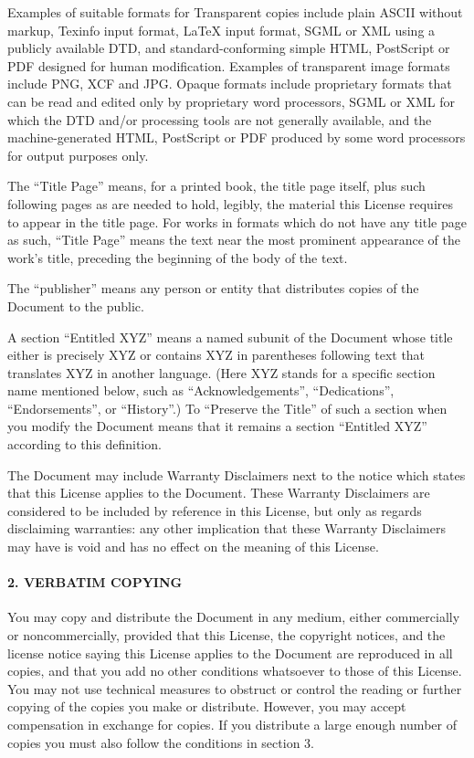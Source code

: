Examples of suitable formats for Transparent copies include plain ASCII
without markup, Texinfo input format, LaTeX input format, SGML or XML
using a publicly available DTD, and standard-conforming simple HTML,
PostScript or PDF designed for human modification. Examples of
transparent image formats include PNG, XCF and JPG. Opaque formats
include proprietary formats that can be read and edited only by
proprietary word processors, SGML or XML for which the DTD and/or
processing tools are not generally available, and the machine-generated
HTML, PostScript or PDF produced by some word processors for output
purposes only.

The ``Title Page'' means, for a printed book, the title page itself,
plus such following pages as are needed to hold, legibly, the material
this License requires to appear in the title page. For works in formats
which do not have any title page as such, ``Title Page'' means the text
near the most prominent appearance of the work's title, preceding the
beginning of the body of the text.

The ``publisher'' means any person or entity that distributes copies of
the Document to the public.

A section ``Entitled XYZ'' means a named subunit of the Document whose
title either is precisely XYZ or contains XYZ in parentheses following
text that translates XYZ in another language. (Here XYZ stands for a
specific section name mentioned below, such as ``Acknowledgements'',
``Dedications'', ``Endorsements'', or ``History''.) To ``Preserve the
Title'' of such a section when you modify the Document means that it
remains a section ``Entitled XYZ'' according to this definition.

The Document may include Warranty Disclaimers next to the notice which
states that this License applies to the Document. These Warranty
Disclaimers are considered to be included by reference in this License,
but only as regards disclaiming warranties: any other implication that
these Warranty Disclaimers may have is void and has no effect on the
meaning of this License.

\hypertarget{verbatim-copying}{%
\paragraph{2. VERBATIM COPYING}\label{verbatim-copying}}

You may copy and distribute the Document in any medium, either
commercially or noncommercially, provided that this License, the
copyright notices, and the license notice saying this License applies to
the Document are reproduced in all copies, and that you add no other
conditions whatsoever to those of this License. You may not use
technical measures to obstruct or control the reading or further copying
of the copies you make or distribute. However, you may accept
compensation in exchange for copies. If you distribute a large enough
number of copies you must also follow the conditions in section 3.

